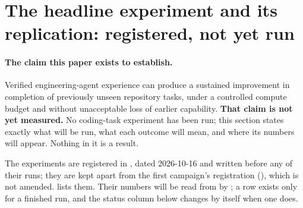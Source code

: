 
\section{The headline experiment and its replication: registered, not yet run}\label{sec:pending}

\paragraph{The claim this paper exists to establish.} Verified engineering-agent experience
can produce a sustained improvement in completion of previously unseen repository tasks,
under a controlled compute budget and without unacceptable loss of earlier capability.
\textbf{That claim is not yet measured.} No coding-task experiment has been run; this
section states exactly what will be run, what each outcome will mean, and where its numbers
will appear. Nothing in it is a result.

The experiments are registered in , dated 2026-10-16 and written
before any of their runs; they are kept apart from the first campaign's registration
(), which is not amended.  lists them. Their
numbers will be read from  by ; a row exists
only for a finished run, and the status column below changes by itself when one does.

\begin{table}[t]
\centering\small

\caption{The registered coding-task experiments. The status is derived from the rows of
.}\label{tab:registered}
\end{table}

